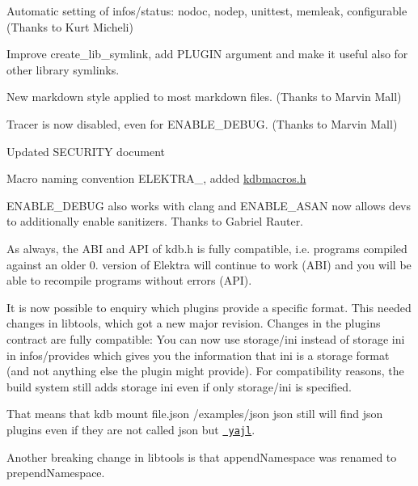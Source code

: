 \begin{DoxyItemize}
\item Automatic setting of {\ttfamily infos/status}\+: {\ttfamily nodoc}, {\ttfamily nodep}, {\ttfamily unittest}, {\ttfamily memleak}, {\ttfamily configurable} (Thanks to Kurt Micheli)
\item Improve {\ttfamily create\+\_\+lib\+\_\+symlink}, add {\ttfamily P\+L\+U\+G\+IN} argument and make it useful also for other library symlinks.
\item New markdown style applied to most markdown files. (Thanks to Marvin Mall)
\item Tracer is now disabled, even for {\ttfamily E\+N\+A\+B\+L\+E\+\_\+\+D\+E\+B\+UG}. (Thanks to Marvin Mall)
\item Updated S\+E\+C\+U\+R\+I\+TY document
\item Macro naming convention {\ttfamily E\+L\+E\+K\+T\+R\+A\+\_\+}, added {\ttfamily \mbox{\hyperlink{kdbmacros_8h}{kdbmacros.\+h}}}
\item {\ttfamily E\+N\+A\+B\+L\+E\+\_\+\+D\+E\+B\+UG} also works with {\ttfamily clang} and {\ttfamily E\+N\+A\+B\+L\+E\+\_\+\+A\+S\+AN} now allows devs to additionally enable sanitizers. Thanks to Gabriel Rauter.
\end{DoxyItemize}

As always, the A\+BI and A\+PI of kdb.\+h is fully compatible, i.\+e. programs compiled against an older 0. version of Elektra will continue to work (A\+BI) and you will be able to recompile programs without errors (A\+PI).

It is now possible to enquiry which plugins provide a specific format. This needed changes in libtools, which got a new major revision. Changes in the plugin\textquotesingle{}s contract are fully compatible\+: You can now use {\ttfamily storage/ini} instead of {\ttfamily storage ini} in {\ttfamily infos/provides} which gives you the information that {\ttfamily ini} is a storage format (and not anything else the plugin might provide). For compatibility reasons, the build system still adds {\ttfamily storage ini} even if only {\ttfamily storage/ini} is specified.

That means that {\ttfamily kdb mount file.\+json /examples/json json} still will find {\ttfamily json} plugins even if they are not called {\ttfamily json} but \href{https://master.libelektra.org/src/plugins/yajl}{\texttt{ yajl}}.

Another breaking change in {\ttfamily libtools} is that {\ttfamily append\+Namespace} was renamed to {\ttfamily prepend\+Namespace}.

